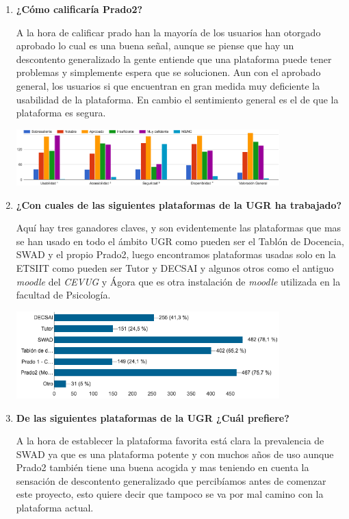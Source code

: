 \begin{enumerate}
\begin{figure}[H]
\end{figure}

  \item \textbf{¿Cómo calificaría Prado2?}


A la hora de calificar prado han la mayoría de los usuarios han otorgado aprobado lo cual es una buena señal, aunque se piense que hay un descontento generalizado la gente entiende que una plataforma puede tener problemas y simplemente espera que se solucionen. Aun con el aprobado general, los usuarios si que encuentran en gran medida muy deficiente la usabilidad de la plataforma. En cambio el sentimiento general es el de que la plataforma es segura.

\includegraphics[width=0.8\textwidth]{../charts/06_calificaria}


  \item \textbf{¿Con cuales de las siguientes plataformas de la UGR ha trabajado?}

Aquí hay tres ganadores claves, y son evidentemente las plataformas que mas se han usado en todo el ámbito UGR como pueden ser el Tablón de Docencia, SWAD y el propio Prado2, luego encontramos plataformas usadas solo en la ETSIIT como pueden ser Tutor y DECSAI y algunos otros como el antiguo \textit{moodle} del \textit{CEVUG} y Ágora que es otra instalación de \textit{moodle} utilizada en la facultad de Psicología.

\includegraphics[width=0.8\textwidth]{../charts/07_plataformastrabajado}

  \item \textbf{De las siguientes plataformas de la UGR ¿Cuál prefiere?}

A la hora de establecer la plataforma favorita está clara la prevalencia de SWAD ya que es una plataforma potente y con muchos años de uso aunque Prado2 también tiene una buena acogida y mas teniendo en cuenta la sensación de descontento generalizado que percibíamos antes de comenzar este proyecto, esto quiere decir que tampoco se va por mal camino con la plataforma actual.


\end{enumerate}
